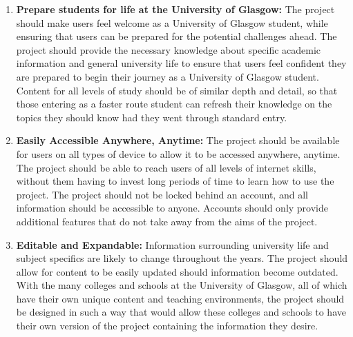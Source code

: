 \documentclass{l4proj}
\begin{document}
\begin{enumerate}
    \item \textbf{Prepare students for life at the University of Glasgow:} The project should make users feel welcome as a University of Glasgow student,  while ensuring that users can be prepared for the potential challenges ahead. The project should provide the necessary knowledge about specific academic information and general university life to ensure that users feel confident they are prepared to begin their journey as a University of Glasgow student. Content for all levels of study should be of similar depth and detail,  so that those entering as a faster route student can refresh their knowledge on the topics they should know had they went through standard entry.


    \item\textbf{Easily Accessible Anywhere,  Anytime:} The project should be available for users on all types of device to allow it to be accessed anywhere,  anytime. The project should be able to reach users of all levels of internet skills,  without them having to invest long periods of time to learn how to use the project. The project should not be locked behind an account,  and all information should be accessible to anyone. Accounts should only provide additional features that do not take away from the aims of the project.


    \item\textbf{Editable and Expandable:} Information surrounding university life and subject specifics are likely to change throughout the years. The project should allow for content to be easily updated should information become outdated. With the many colleges and schools at the University of Glasgow,  all of which have their own unique content and teaching environments,  the project should be designed in such a way that would allow these colleges and schools to have their own version of the project containing the information they desire.
\end{enumerate}
\end{document}
